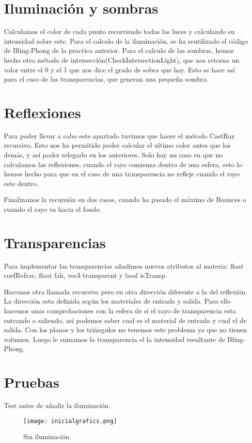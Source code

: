 \section{Iluminación y sombras}
Calculamos el color de cada punto recorriendo todas las luces y calculando su intensidad sobre este.
Para el calculo de la iluminación, se ha reutilizado el código de Bling-Phong de la practica anterior.
Para el calculo de las sombras, hemos hecho otro método de intersección(CheckIntersectionLight), que nos retorna un valor entre el 0 y el 1 que nos dice el grado de sobra que hay. Esto se hace así para el caso de las transparencias, que generan una pequeña sombra.

\section{Reflexiones}
Para poder llevar a cabo este apartado tuvimos que hacer el método CastRay recursivo.
Esto nos ha permitido poder calcular el ultimo color antes que los demás, y así poder relegarlo en los anteriores. Solo hay un caso en que no calculamos las reflexiones, cuando el rayo comienza dentro de una esfera, esto lo hemos hecho para que en el caso de una transparencia no refleje cuando el rayo este dentro.

Finalizamos la recursión en dos casos, cuando ha pasado el máximo de Bounces o cuando el rayo va hacia el fondo.
\section{Transparencias}
Para implementar las transparencias añadimos nuevos atributos al materia: float coefRefrac, float fah, vec3 transparent y bool isTransp.

Hacemos otra llamada recursiva pero en otra dirección diferente a la del reflexión. La dirección esta definida según los materiales de entrada y salida. Para ello hacemos unas comprobaciones con la esfera de si el rayo de transparencia esta entrando o saliendo, así podemos saber cual es el material de entrada y cual el de salida. Con los planos y los triángulos no tenemos este problema ya que no tienen volumen.
Luego le sumamos la transparencia el la intensidad resultante de Bling-Phong.

\section{Pruebas}
Test antes de añadir la iluminación.
\begin{figure}[H]
\centering
\texttt{[image: inicialgrafics.png]}
\caption{Sin iluminación.}\label{visina8}
\end{figure}


